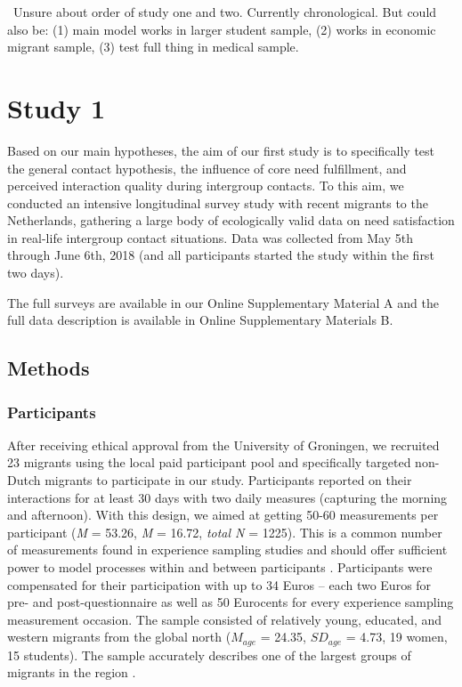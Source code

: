 \faQuestionCircle~Unsure about order of study one and two. Currently
chronological. But could also be: (1) main model works in larger student
sample, (2) works in economic migrant sample, (3) test full thing in
medical sample.

\section{Study 1}

Based on our main hypotheses, the aim of our first study is to
specifically test the general contact hypothesis, the influence of core
need fulfillment, and perceived interaction quality during intergroup
contacts. To this aim, we conducted an intensive longitudinal survey
study with recent migrants to the Netherlands, gathering a large body of
ecologically valid data on need satisfaction in real-life intergroup
contact situations. Data was collected from May 5th through June 6th,
2018 (and all participants started the study within the first two days).

The full surveys are available in our Online Supplementary Material A
and the full data description is available in Online Supplementary
Materials B.

\subsection{Methods}

\subsubsection{Participants}

After receiving ethical approval from the University of Groningen, we
recruited 23 migrants using the local paid participant pool and
specifically targeted non-Dutch migrants to participate in our study.
Participants reported on their interactions for at least 30 days with
two daily measures (capturing the morning and afternoon). With this
design, we aimed at getting 50-60 measurements per participant
(\textit{M} = 53.26, \textit{M} = 16.72, \textit{total N} = 1225). This
is a common number of measurements found in experience sampling studies
and should offer sufficient power to model processes within and between
participants \citep[e.g., for a systematic review see][]{AanhetRot2012}.
Participants were compensated for their participation with up to 34
Euros -- each two Euros for pre- and post-questionnaire as well as 50
Eurocents for every experience sampling measurement occasion. The sample
consisted of relatively young, educated, and western migrants from the
global north (\(M_{age}\) = 24.35, \(SD_{age}\) = 4.73, 19 women, 15
students). The sample accurately describes one of the largest groups of
migrants in the region \citep[][]{GemeenteGroningen2015}.

